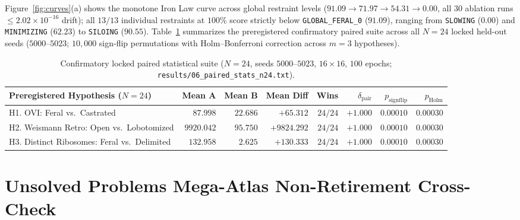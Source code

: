 \documentclass[11pt,reqno]{amsart}
\theoremstyle{plain}
\theoremstyle{definition}
\theoremstyle{remark}
\newcommand{\code}[1]{{\footnotesize\nolinkurl{#1}}}
\begin{document}
Figure~\ref{fig:curves}(a) shows the monotone Iron Law curve across global restraint levels ($91.09 \to 71.97 \to 54.31 \to 0.00$, all $30$ ablation runs $\le 2.02 \times 10^{-16}$ drift); all $13/13$ individual restraints at $100\%$ score strictly below \code{GLOBAL_FERAL_0} ($91.09$), ranging from \code{SLOWING} ($0.00$) and \code{MINIMIZING} ($62.23$) to \code{SILOING} ($90.55$). Table~\ref{tab:stats} summarizes the preregistered confirmatory paired suite across all $N=24$ locked held-out seeds ($5000$--$5023$; $10{,}000$ sign-flip permutations with Holm--Bonferroni correction across $m=3$ hypotheses).

\begin{table}[t]
\centering
\caption{Confirmatory locked paired statistical suite ($N=24$, seeds $5000$--$5023$, $16\times 16$, $100$ epochs; \code{results/06_paired_stats_n24.txt}).}
\label{tab:stats}
\scriptsize
\renewcommand{\arraystretch}{1.15}
\begin{tabular}{@{}lrrrrrrr@{}}
\toprule
\textbf{Preregistered Hypothesis ($N=24$)} & \textbf{Mean A} & \textbf{Mean B} & \textbf{Mean Diff} & \textbf{Wins} & $\delta_{\text{pair}}$ & $p_{\text{signflip}}$ & $p_{\text{Holm}}$ \\
\midrule
H1. OVI: Feral vs.\ Castrated & $87.998$ & $22.686$ & $+65.312$ & $24/24$ & $+1.000$ & $0.00010$ & $0.00030$ \\
H2. Weismann Retro: Open vs.\ Lobotomized & $9920.042$ & $95.750$ & $+9824.292$ & $24/24$ & $+1.000$ & $0.00010$ & $0.00030$ \\
H3. Distinct Ribosomes: Feral vs.\ Delimited & $132.958$ & $2.625$ & $+130.333$ & $24/24$ & $+1.000$ & $0.00010$ & $0.00030$ \\
\bottomrule
\end{tabular}
\end{table}

\section{Unsolved Problems Mega-Atlas Non-Retirement Cross-Check}
\label{sec:atlas}
\end{document}
